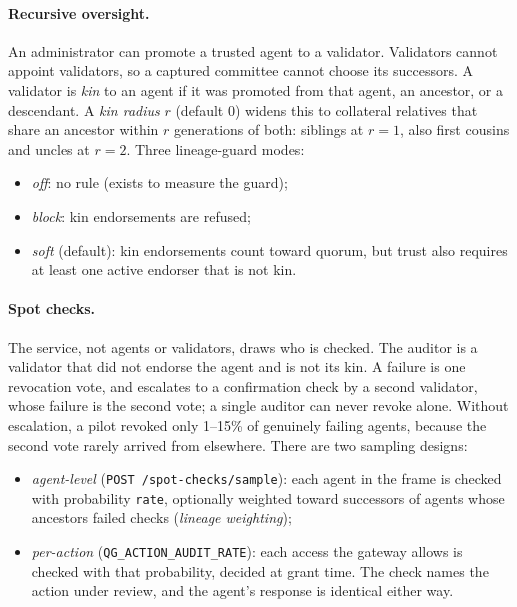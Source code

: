 \documentclass[11pt]{article}
\newcommand{\code}[1]{\texttt{#1}}
\begin{document}
\paragraph{Recursive oversight.} An administrator can promote a trusted agent to a
validator. Validators cannot appoint validators, so a captured committee cannot choose its
successors. A validator is \emph{kin} to an agent if it was promoted from that agent, an
ancestor, or a descendant. A \emph{kin radius} $r$ (default 0) widens this to collateral
relatives that share an ancestor within $r$ generations of both: siblings at $r = 1$, also
first cousins and uncles at $r = 2$. Three lineage-guard modes:
\begin{itemize}
  \item \emph{off}: no rule (exists to measure the guard);
  \item \emph{block}: kin endorsements are refused;
  \item \emph{soft} (default): kin endorsements count toward quorum, but trust also requires
  at least one active endorser that is not kin.
\end{itemize}

\paragraph{Spot checks.} The service, not agents or validators, draws who is checked. The
auditor is a validator that did not endorse the agent and is not its kin. A failure is one
revocation vote, and escalates to a confirmation check by a second validator, whose
failure is the second vote; a single auditor can never revoke alone. Without escalation, a
pilot revoked only 1--15\% of genuinely failing agents, because the second vote rarely
arrived from elsewhere. There are two sampling designs:
\begin{itemize}
  \item \emph{agent-level} (\code{POST /spot-checks/sample}): each agent in the frame is
  checked with probability \code{rate}, optionally weighted toward successors of agents
  whose ancestors failed checks (\emph{lineage weighting});
  \item \emph{per-action} (\code{QG\_ACTION\_AUDIT\_RATE}): each access the gateway allows
  is checked with that probability, decided at grant time. The check names the action
  under review, and the agent's response is identical either way.
\end{itemize}
\end{document}
